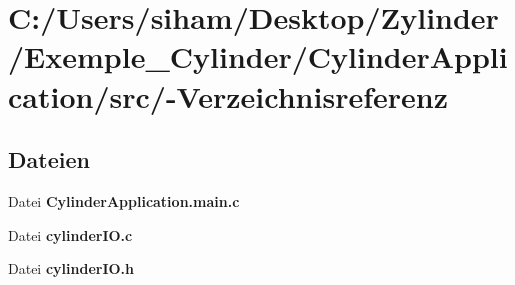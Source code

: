 \section{C:/Users/siham/Desktop/Zylinder/Exemple\_\-Cylinder/Cylinder\-Application/src/-Verzeichnisreferenz}
\label{dir_C_3A_2FUsers_2Fsiham_2FDesktop_2FZylinder_2FExemple_5FCylinder_2FCylinderApplication_2Fsrc_2F}


\subsection*{Dateien}
\begin{CompactItemize}
\item 
Datei {\bf Cylinder\-Application.main.c}
\item 
Datei {\bf cylinder\-IO.c}
\item 
Datei {\bf cylinder\-IO.h}
\end{CompactItemize}
